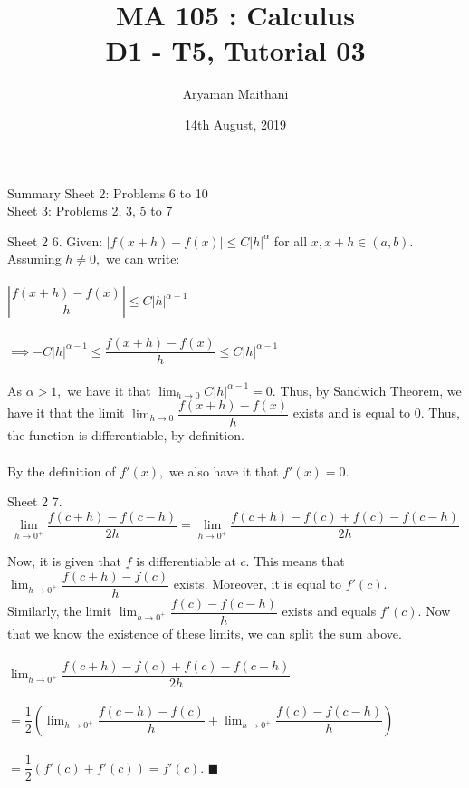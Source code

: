 \documentclass[handout, aspectratio=169]{beamer}
\title{MA 105 : Calculus\\ D1 - T5, Tutorial 03}  %
\author{Aryaman Maithani}
\date[14-08-2019]{14th August, 2019}               %
\institute[IITB]{IIT Bombay}
\begin{document}
\begin{frame}
	\titlepage
\end{frame}
\begin{frame}{Summary} 
	Sheet 2: Problems 6 to 10\\	
	Sheet 3: Problems 2, 3, 5 to 7
\end{frame}
\begin{frame}{Sheet 2}                            %
	6. Given: $|f(x+h) - f(x)| \le C|h|^\alpha$ for all $x, x + h \in (a, b).$\\
	Assuming $h \neq 0,$ we can write:\\~\\
	$\left|\dfrac{f(x + h) - f(x)}{h}\right| \le C|h|^{\alpha-1}$\\~\\
	$\implies -C|h|^{\alpha-1} \le \dfrac{f(x + h) - f(x)}{h} \le C|h|^{\alpha-1}$\\~\\
	As $\alpha > 1,$ we have it that $\displaystyle\lim_{h\to 0}C|h|^{\alpha-1} = 0.$ Thus, by Sandwich Theorem, we have it that the limit $\displaystyle\lim_{h\to 0}\dfrac{f(x + h) - f(x)}{h}$ exists and is equal to 0. Thus, the function is differentiable, by definition.\\~\\
	By the definition of $f'(x),$ we also have it that $f'(x) = 0.$
\end{frame}
\begin{frame}{Sheet 2}
7. \[\lim_{h\to 0^+}\dfrac{f(c + h) - f(c - h)}{2h}%
		= \lim_{h\to 0^+}\dfrac{f(c + h) - f(c) + f(c) - f(c - h)}{2h}\]

Now, it is given that $f$ is differentiable at $c.$ This means that $\displaystyle\lim_{h\to 0^+}\dfrac{f(c + h) - f(c)}{h}$ exists. Moreover, it is equal to $f'(c).$\\
Similarly, the limit $\displaystyle\lim_{h\to 0^+}\dfrac{f(c) - f(c-h)}{h}$ exists and equals $f'(c).$ Now that we know the existence of these limits, we can split the sum above.\\~\\
$\displaystyle\lim_{h\to 0^+}\dfrac{f(c + h) - f(c) + f(c) - f(c - h)}{2h}$\\~\\
$=\displaystyle\dfrac{1}{2}\left(\lim_{h\to 0^+}\dfrac{f(c + h) - f(c)}{h} + \lim_{h\to 0^+}\dfrac{f(c) - f(c - h)}{h}\right)$\\~\\
$=\dfrac{1}{2}\left(f'(c) + f'(c)\right) = f'(c).$ \hfill $\blacksquare$
\end{frame}
\end{document}
